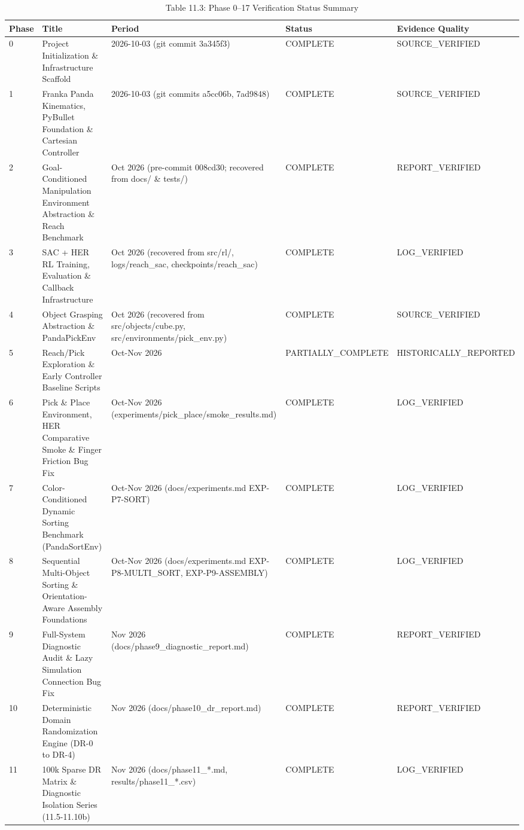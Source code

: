 \begin{longtable}{l l l l l}\caption{Table 11.3: Phase 0–17 Verification Status Summary}\\\toprule
Phase & Title & Period & Status & Evidence Quality \\ \midrule \endhead
0 & Project Initialization \& Infrastructure Scaffold & 2026-10-03 (git commit 3a345f3) & COMPLETE & SOURCE\_VERIFIED \\
1 & Franka Panda Kinematics, PyBullet Foundation \& Cartesian Controller & 2026-10-03 (git commits a5cc06b, 7ad9848) & COMPLETE & SOURCE\_VERIFIED \\
2 & Goal-Conditioned Manipulation Environment Abstraction \& Reach Benchmark & Oct 2026 (pre-commit 008cd30; recovered from docs/ \& tests/) & COMPLETE & REPORT\_VERIFIED \\
3 & SAC + HER RL Training, Evaluation \& Callback Infrastructure & Oct 2026 (recovered from src/rl/, logs/reach\_sac, checkpoints/reach\_sac) & COMPLETE & LOG\_VERIFIED \\
4 & Object Grasping Abstraction \& PandaPickEnv & Oct 2026 (recovered from src/objects/cube.py, src/environments/pick\_env.py) & COMPLETE & SOURCE\_VERIFIED \\
5 & Reach/Pick Exploration \& Early Controller Baseline Scripts & Oct-Nov 2026 & PARTIALLY\_COMPLETE & HISTORICALLY\_REPORTED \\
6 & Pick \& Place Environment, HER Comparative Smoke \& Finger Friction Bug Fix & Oct-Nov 2026 (experiments/pick\_place/smoke\_results.md) & COMPLETE & LOG\_VERIFIED \\
7 & Color-Conditioned Dynamic Sorting Benchmark (PandaSortEnv) & Oct-Nov 2026 (docs/experiments.md EXP-P7-SORT) & COMPLETE & LOG\_VERIFIED \\
8 & Sequential Multi-Object Sorting \& Orientation-Aware Assembly Foundations & Oct-Nov 2026 (docs/experiments.md EXP-P8-MULTI\_SORT, EXP-P9-ASSEMBLY) & COMPLETE & LOG\_VERIFIED \\
9 & Full-System Diagnostic Audit \& Lazy Simulation Connection Bug Fix & Nov 2026 (docs/phase9\_diagnostic\_report.md) & COMPLETE & REPORT\_VERIFIED \\
10 & Deterministic Domain Randomization Engine (DR-0 to DR-4) & Nov 2026 (docs/phase10\_dr\_report.md) & COMPLETE & REPORT\_VERIFIED \\
11 & 100k Sparse DR Matrix \& Diagnostic Isolation Series (11.5-11.10b) & Nov 2026 (docs/phase11\_*.md, results/phase11\_*.csv) & COMPLETE & LOG\_VERIFIED \\

\end{longtable}

